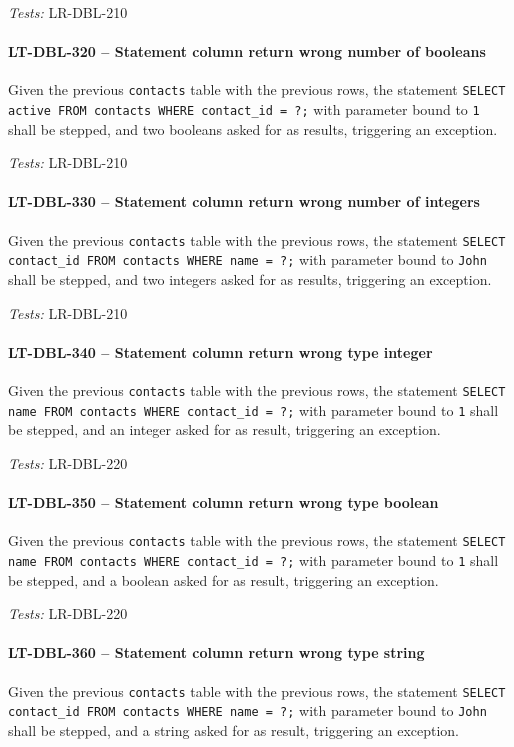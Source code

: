\textit{Tests: } LR-DBL-210

\paragraph{LT-DBL-320 -- Statement column return wrong number of booleans}
Given the previous \lstinline{contacts} table with the previous rows,
the statement
\lstinline{SELECT active FROM contacts WHERE contact_id = ?;}
with parameter bound to \lstinline{1} shall be stepped,
and two booleans asked for as results, triggering an exception.

\textit{Tests: } LR-DBL-210

\paragraph{LT-DBL-330 -- Statement column return wrong number of integers}
Given the previous \lstinline{contacts} table with the previous rows,
the statement
\lstinline{SELECT contact_id FROM contacts WHERE name = ?;}
with parameter bound to \lstinline{John} shall be stepped,
and two integers asked for as results, triggering an exception.

\textit{Tests: } LR-DBL-210

\paragraph{LT-DBL-340 -- Statement column return wrong type integer}
Given the previous \lstinline{contacts} table with the previous rows,
the statement
\lstinline{SELECT name FROM contacts WHERE contact_id = ?;}
with parameter bound to \lstinline{1} shall be stepped,
and an integer asked for as result, triggering an exception.

\textit{Tests: } LR-DBL-220

\paragraph{LT-DBL-350 -- Statement column return wrong type boolean}
Given the previous \lstinline{contacts} table with the previous rows,
the statement
\lstinline{SELECT name FROM contacts WHERE contact_id = ?;}
with parameter bound to \lstinline{1} shall be stepped,
and a boolean asked for as result, triggering an exception.

\textit{Tests: } LR-DBL-220

\paragraph{LT-DBL-360 -- Statement column return wrong type string}
Given the previous \lstinline{contacts} table with the previous rows,
the statement
\lstinline{SELECT contact_id FROM contacts WHERE name = ?;}
with parameter bound to \lstinline{John} shall be stepped,
and a string asked for as result, triggering an exception.

